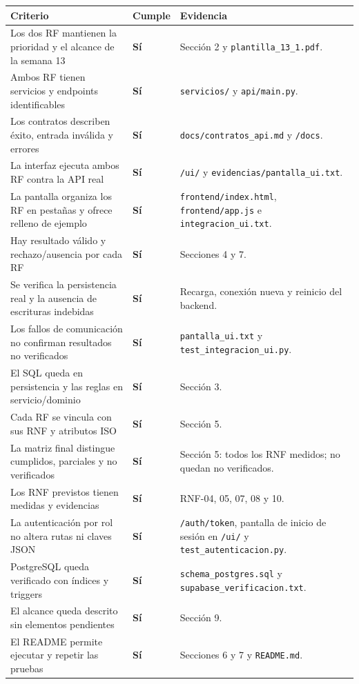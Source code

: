\documentclass[11pt,a4paper]{article}
\newcommand{\code}[1]{\texttt{#1}}
\newcommand{\thead}[1]{\textbf{#1}}
\begin{document}
{\footnotesize
\begin{tabularx}{\linewidth}{@{}V{1.9}Z{0.35}V{0.75}@{}}
\toprule
\thead{Criterio} & \thead{Cumple} & \thead{Evidencia} \\ \midrule
Los dos RF mantienen la prioridad y el alcance de la semana 13 & \textbf{Sí} &
Sección 2 y \code{plantilla\_13\_1.pdf}. \\
Ambos RF tienen servicios y endpoints identificables & \textbf{Sí} &
\code{servicios/} y \code{api/main.py}. \\
Los contratos describen éxito, entrada inválida y errores & \textbf{Sí} &
\code{docs/contratos\_api.md} y \code{/docs}. \\
La interfaz ejecuta ambos RF contra la API real & \textbf{Sí} &
\code{/ui/} y \code{evidencias/pantalla\_ui.txt}. \\
La pantalla organiza los RF en pestañas y ofrece relleno de ejemplo &
\textbf{Sí} & \code{frontend/index.html}, \code{frontend/app.js} e
\code{integracion\_ui.txt}. \\
Hay resultado válido y rechazo/ausencia por cada RF & \textbf{Sí} &
Secciones 4 y 7. \\
Se verifica la persistencia real y la ausencia de escrituras indebidas &
\textbf{Sí} & Recarga, conexión nueva y reinicio del backend. \\
Los fallos de comunicación no confirman resultados no verificados &
\textbf{Sí} & \code{pantalla\_ui.txt} y \code{test\_integracion\_ui.py}. \\
El SQL queda en persistencia y las reglas en servicio/dominio & \textbf{Sí} &
Sección 3. \\
Cada RF se vincula con sus RNF y atributos ISO & \textbf{Sí} & Sección 5. \\
La matriz final distingue cumplidos, parciales y no verificados & \textbf{Sí} &
Sección 5: todos los RNF medidos; no quedan no verificados. \\
Los RNF previstos tienen medidas y evidencias & \textbf{Sí} &
RNF-04, 05, 07, 08 y 10. \\
La autenticación por rol no altera rutas ni claves JSON & \textbf{Sí} &
\code{/auth/token}, pantalla de inicio de sesión en \code{/ui/} y
\code{test\_autenticacion.py}. \\
PostgreSQL queda verificado con índices y triggers & \textbf{Sí} &
\code{schema\_postgres.sql} y \code{supabase\_verificacion.txt}. \\
El alcance queda descrito sin elementos pendientes & \textbf{Sí} &
Sección 9. \\
El README permite ejecutar y repetir las pruebas & \textbf{Sí} &
Secciones 6 y 7 y \code{README.md}. \\
\bottomrule
\end{tabularx}
}
\end{document}
